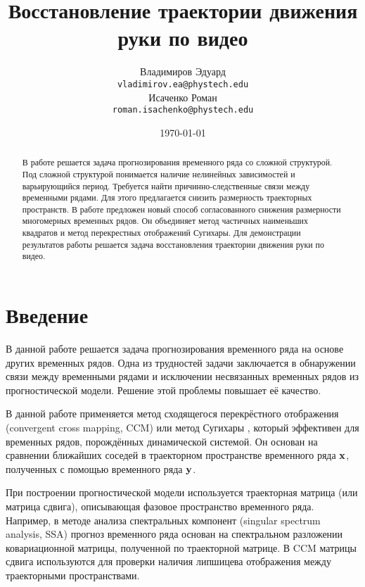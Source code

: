 \documentclass[a4paper, 12pt]{article}
\title{Восстановление траектории движения руки по видео}
\author{Владимиров Эдуард \\
	\texttt{vladimirov.ea@phystech.edu} \\
	
	\And
	Исаченко Роман \\
	\texttt{roman.isachenko@phystech.edu} \\
	
}
\date{\today}
\begin{document}
\maketitle

\begin{abstract}
	В работе решается задача прогнозирования временного ряда со сложной структурой. Под сложной структурой понимается наличие нелинейных зависимостей и варьирующийся период. Требуется найти причинно-следственные связи между временными рядами. Для этого предлагается снизить размерность траекторных пространств. В работе предложен новый способ согласованного снижения размерности многомерных временных рядов. Он объединяет метод частичных наименьших квадратов и метод перекрестных отображений Сугихары. Для демонстрации результатов работы решается задача восстановления траектории движения руки по видео.
\end{abstract}



\section{Введение}

В данной работе решается задача прогнозирования временного ряда на основе других временных рядов. 
Одна из трудностей задачи заключается в обнаружении связи между временными рядами и исключении несвязанных временных рядов из прогностической модели. 
Решение этой проблемы повышает её качество.

В данной работе применяется метод сходящегося перекрёстного отображения (convergent cross mapping, CCM) или метод Сугихары \citep{Sugihara90, sugihara1990nonlinear}, который эффективен для временных рядов, порождённых динамической системой. 
Он основан на сравнении ближайших соседей в траекторном пространстве временного ряда $\mathbf{x}$, полученных с помощью временного ряда $\mathbf{y}$.

При построении прогностической модели используется траекторная матрица (или матрица сдвига), описывающая фазовое пространство временного ряда. 
Например, в методе анализа спектральных компонент (singular spectrum analysis, SSA) \citep{golyandina2005ssa, golyandina2001analysis, zhigljavsky2010singular} прогноз временного ряда основан на спектральном разложении ковариационной матрицы, полученной по траекторной матрице. 
В CCM матрицы сдвига используются для проверки наличия липшицева отображения между траекторными пространствами.
\end{document}
